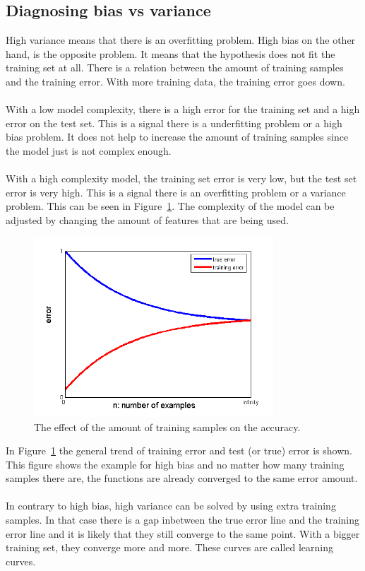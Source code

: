 \subsection{Diagnosing bias vs variance}
High variance means that there is an overfitting problem. High bias on the other hand, is the opposite problem. It means that the hypothesis does not fit the training set at all. There is a relation between the amount of training samples and the training error. With more training data, the training error goes down. \\\\
With a low model complexity, there is a high error for the training set and a high error on the test set. This is a signal there is a underfitting problem or a high bias problem. It does not help to increase the amount of training samples since the model just is not complex enough. \\\\
With a high complexity model, the training set error is very low, but the test set error is very high. This is a signal there is an overfitting problem or a variance problem. This can be seen in Figure~\ref{fig:trainingsamples}. The complexity of the model can be adjusted by changing the amount of features that are being used. \cite{stanford}

\begin{figure}[H]
\centering
\includegraphics[width=0.8\textwidth]{Figures/bias_variance_chart}
\decoRule
\caption[Training samples comparison]{The effect of the amount of training samples on the accuracy.}
\label{fig:trainingsamples}
\end{figure}
\noindent In Figure~\ref{fig:trainingsamples} the general trend of training error and test (or true) error is shown. This figure shows the example for high bias and no matter how many training samples there are, the functions are already converged to the same error amount.\\\\
In contrary to high bias, high variance can be solved by using extra training samples. In that case there is a gap inbetween the true error line and the training error line and it is likely that they still converge to the same point. With a bigger training set, they converge more and more. These curves are called learning curves.

